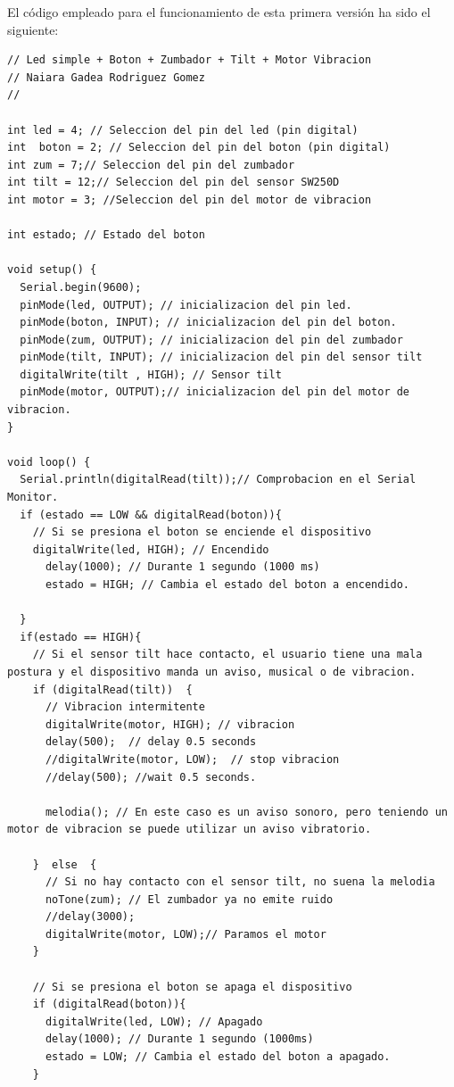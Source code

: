 \clearpage
El código empleado para el funcionamiento de esta primera versión ha sido el siguiente:
\begin{lstlisting}
// Led simple + Boton + Zumbador + Tilt + Motor Vibracion
// Naiara Gadea Rodriguez Gomez
// 

int led = 4; // Seleccion del pin del led (pin digital)
int  boton = 2; // Seleccion del pin del boton (pin digital)
int zum = 7;// Seleccion del pin del zumbador
int tilt = 12;// Seleccion del pin del sensor SW250D
int motor = 3; //Seleccion del pin del motor de vibracion

int estado; // Estado del boton

void setup() {
  Serial.begin(9600);
  pinMode(led, OUTPUT); // inicializacion del pin led.
  pinMode(boton, INPUT); // inicializacion del pin del boton.
  pinMode(zum, OUTPUT); // inicializacion del pin del zumbador
  pinMode(tilt, INPUT); // inicializacion del pin del sensor tilt
  digitalWrite(tilt , HIGH); // Sensor tilt 
  pinMode(motor, OUTPUT);// inicializacion del pin del motor de vibracion.
}

void loop() {
  Serial.println(digitalRead(tilt));// Comprobacion en el Serial Monitor.
  if (estado == LOW && digitalRead(boton)){
    // Si se presiona el boton se enciende el dispositivo
    digitalWrite(led, HIGH); // Encendido
      delay(1000); // Durante 1 segundo (1000 ms)
      estado = HIGH; // Cambia el estado del boton a encendido.
    
  }
  if(estado == HIGH){
    // Si el sensor tilt hace contacto, el usuario tiene una mala postura y el dispositivo manda un aviso, musical o de vibracion.
    if (digitalRead(tilt))  {
      // Vibracion intermitente
      digitalWrite(motor, HIGH); // vibracion
      delay(500);  // delay 0.5 seconds
      //digitalWrite(motor, LOW);  // stop vibracion
      //delay(500); //wait 0.5 seconds.
      
      melodia(); // En este caso es un aviso sonoro, pero teniendo un motor de vibracion se puede utilizar un aviso vibratorio.
      
    }  else  {
      // Si no hay contacto con el sensor tilt, no suena la melodia
      noTone(zum); // El zumbador ya no emite ruido
      //delay(3000);
      digitalWrite(motor, LOW);// Paramos el motor
    }

    // Si se presiona el boton se apaga el dispositivo
    if (digitalRead(boton)){
      digitalWrite(led, LOW); // Apagado
      delay(1000); // Durante 1 segundo (1000ms)
      estado = LOW; // Cambia el estado del boton a apagado.
    }
    

\end{lstlisting}
